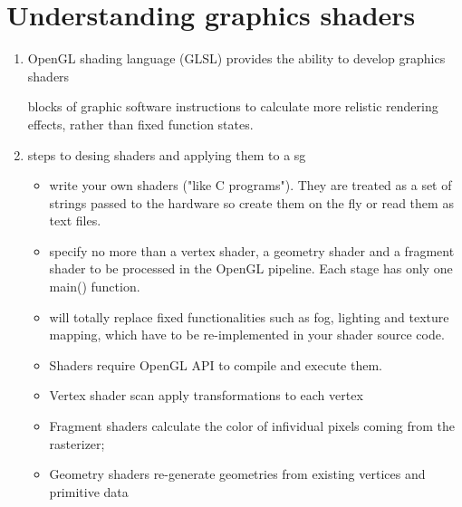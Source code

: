 \documentclass[a4paper,12pt]{book}
\begin{document}
\section{Understanding graphics shaders}
\begin{enumerate}

\item OpenGL shading language (GLSL) provides the ability to develop graphics shaders

\textrightarrow blocks of graphic software instructions to calculate more relistic rendering effects, rather than fixed function states.

\item steps to desing shaders and applying them to a sg
\begin{itemize}
\item write your own shaders ("like C programs"). They are treated as a set of strings passed to the hardware so create them on the fly or read them as text files.


\item specify no more than a vertex shader, a geometry shader and a fragment shader to be processed in the OpenGL pipeline. Each stage has only one main() function.

\item will totally replace fixed functionalities such as fog, lighting and texture mapping, which have to be re-implemented in your shader source code.

\item Shaders require OpenGL API to compile and execute them.
\item Vertex shader scan apply transformations to each vertex
\item Fragment shaders calculate the color of infividual pixels coming from the rasterizer;
\item Geometry shaders re-generate geometries from existing vertices and primitive data

\end{itemize}

\end{enumerate}
\end{document}
